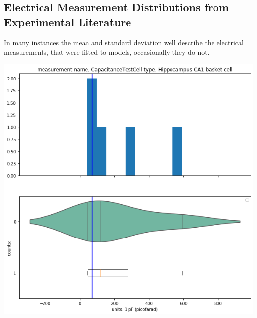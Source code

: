 \subsection{Electrical Measurement Distributions from Experimental Literature}%


In many instances the mean and standard deviation well describe the electrical measurements, that were fitted to models, occasionally they do not.    


    


    \begin{center}
    \includegraphics[width=0.7\linewidth]{notebooks_converted/needata_thesis_files/needata_thesis_5_4}
    \end{center}

